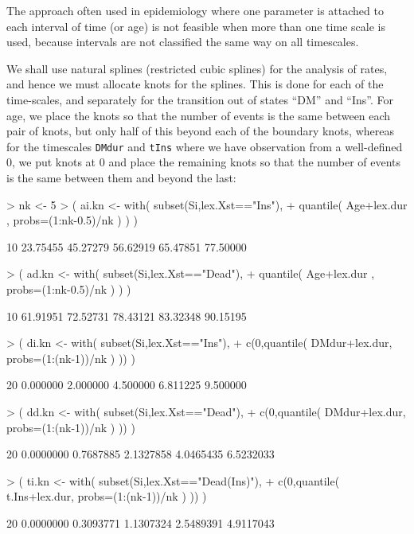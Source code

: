 \documentclass[a4paper,twoside,12pt]{report}
\begin{document}
The approach often used in epidemiology where one parameter is
attached to each interval of time (or age) is not feasible when more
than one time scale is used, because intervals are not classified the
same way on all timescales.

We shall use natural splines (restricted cubic splines) for the
analysis of rates, and hence we must allocate knots for the
splines. This is done for each of the time-scales, and separately for
the transition out of states ``DM'' and ``Ins''. For age, we place the
knots so that the number of events is the same between each pair of
knots, but only half of this beyond each of the boundary knots,
whereas for the timescales \texttt{DMdur} and \texttt{tIns} where we
have observation from a well-defined 0, we put knots at 0 and place the
remaining knots so that the number of events is the same between them
and beyond the last:
\begin{Schunk}
\begin{Sinput}
> nk <- 5
> ( ai.kn <- with( subset(Si,lex.Xst=="Ins"),
+                  quantile( Age+lex.dur  , probs=(1:nk-0.5)/nk ) ) )
\end{Sinput}
\begin{Soutput}
     10%      30%      50%      70%      90% 
23.75455 45.27279 56.62919 65.47851 77.50000 
\end{Soutput}
\begin{Sinput}
> ( ad.kn <- with( subset(Si,lex.Xst=="Dead"),
+                  quantile( Age+lex.dur  , probs=(1:nk-0.5)/nk ) ) )
\end{Sinput}
\begin{Soutput}
     10%      30%      50%      70%      90% 
61.91951 72.52731 78.43121 83.32348 90.15195 
\end{Soutput}
\begin{Sinput}
> ( di.kn <- with( subset(Si,lex.Xst=="Ins"),
+                  c(0,quantile( DMdur+lex.dur, probs=(1:(nk-1))/nk ) )) )
\end{Sinput}
\begin{Soutput}
              20%      40%      60%      80% 
0.000000 2.000000 4.500000 6.811225 9.500000 
\end{Soutput}
\begin{Sinput}
> ( dd.kn <- with( subset(Si,lex.Xst=="Dead"),
+                  c(0,quantile( DMdur+lex.dur, probs=(1:(nk-1))/nk ) )) )
\end{Sinput}
\begin{Soutput}
                20%       40%       60%       80% 
0.0000000 0.7687885 2.1327858 4.0465435 6.5232033 
\end{Soutput}
\begin{Sinput}
> ( ti.kn <- with( subset(Si,lex.Xst=="Dead(Ins)"),
+                  c(0,quantile( t.Ins+lex.dur, probs=(1:(nk-1))/nk ) )) )
\end{Sinput}
\begin{Soutput}
                20%       40%       60%       80% 
0.0000000 0.3093771 1.1307324 2.5489391 4.9117043 
\end{Soutput}
\end{Schunk}
\end{document}
